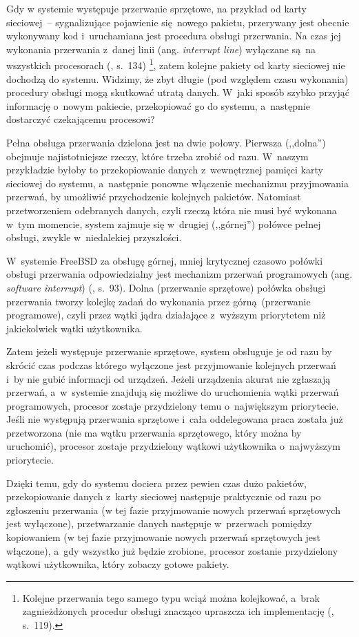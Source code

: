 \documentclass[shortabstract]{iithesis}
\theoremstyle{definition} \newtheorem*{definition}{Definicja}
\theoremstyle{definition} \newtheorem*{example}{Przykład}
\theoremstyle{definition} \newtheorem*{remark}{Uwaga}
\begin{document}
Gdy w systemie występuje przerwanie sprzętowe, na przykład od karty sieciowej~-- sygnalizujące pojawienie
się nowego pakietu, przerywany jest obecnie wykonywany kod i~uruchamiana jest procedura obsługi przerwania.
Na czas jej wykonania przerwania z~danej linii (ang. \textit{interrupt line})
wyłączane są na wszystkich procesorach (\cite{bib:lkd}, s.~134) \footnote{Kolejne przerwania tego samego typu
wciąż można kolejkować, a~brak zagnieżdżonych procedur obsługi znacząco upraszcza ich
implementację (\cite{bib:lkd}, s.~119).}, zatem kolejne pakiety od karty sieciowej nie dochodzą do systemu.
Widzimy, że zbyt długie (pod względem czasu wykonania)
procedury obsługi mogą skutkować utratą danych. W~jaki sposób szybko przyjąć informację o~nowym pakiecie,
przekopiować go do systemu, a~następnie dostarczyć czekającemu procesowi?

Pełna obsługa przerwania dzielona jest na dwie połowy. Pierwsza (,,dolna'') obejmuje najistotniejsze rzeczy,
które trzeba zrobić od razu. W~naszym przykładzie byłoby to przekopiowanie danych z~wewnętrznej pamięci
karty sieciowej do systemu, a~następnie ponowne włączenie mechanizmu przyjmowania przerwań, by umożliwić
przychodzenie kolejnych pakietów.
Natomiast przetworzeniem odebranych danych, czyli rzeczą która nie musi być wykonana w~tym momencie,
system zajmuje
się w~drugiej (,,górnej'') połówce pełnej obsługi, zwykle w~niedalekiej przyszłości.

W~systemie FreeBSD za obsługę górnej, mniej krytycznej czasowo połówki
obsługi przerwania odpowiedzialny jest mechanizm
przerwań programowych (ang. \textit{software interrupt}) (\cite{bib:freebsd}, s.~93).
Dolna (przerwanie sprzętowe) połówka obsługi przerwania tworzy
kolejkę zadań do wykonania przez górną (przerwanie programowe), czyli przez wątki jądra działające
z~wyższym priorytetem niż jakiekolwiek wątki użytkownika.

Zatem jeżeli występuje przerwanie sprzętowe, system obsługuje je od razu by skrócić czas podczas którego
wyłączone jest przyjmowanie kolejnych przerwań i~by nie gubić informacji od urządzeń.
Jeżeli urządzenia akurat nie zgłaszają przerwań, a~w~systemie znajdują się możliwe do uruchomienia wątki
przerwań programowych,
procesor zostaje przydzielony temu o~największym priorytecie. Jeśli nie występują przerwania sprzętowe
i~cała oddelegowana praca została już przetworzona (nie ma wątku przerwania sprzętowego, który można by uruchomić),
procesor zostaje przydzielony wątkowi użytkownika o~najwyższym priorytecie.

Dzięki temu, gdy do systemu dociera przez pewien czas dużo
pakietów, przekopiowanie danych z~karty sieciowej następuje praktycznie
od razu po zgłoszeniu przerwania
(w tej fazie przyjmowanie nowych przerwań sprzętowych jest wyłączone),
przetwarzanie danych następuje w~przerwach pomiędzy kopiowaniem (w tej fazie przyjmowanie nowych przerwań sprzętowych
jest włączone), a~gdy wszystko już będzie zrobione,
procesor zostanie przydzielony wątkowi użytkownika, który zobaczy gotowe pakiety.
\end{document}
